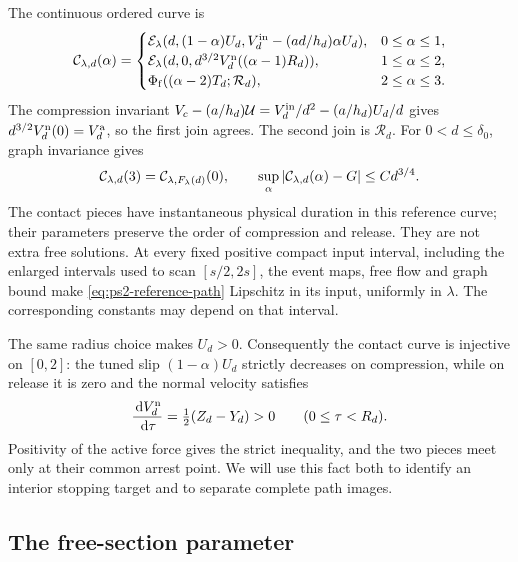 The continuous ordered curve is
\begin{equation}
 \mathcal C_{\lambda,d}(\alpha)=
 \begin{cases}
 \mathcal E_\lambda(d,(1-\alpha)U_d,
                  V_d^{\rm in}-(ad/h_d)\alpha U_d),&0\le\alpha\le1,\\
 \mathcal E_\lambda(d,0,d^{3/2}V_d^{\rm n}((\alpha-1)R_d)),&1\le\alpha\le2,\\
 \Phi_{\rm f}((\alpha-2)T_d;\mathcal R_d),&2\le\alpha\le3.
 \end{cases}\label{eq:ps2-reference-path}
\end{equation}
The compression invariant
$V_c-(a/h_d)\mathcal U=V_d^{\rm in}/d^2-(a/h_d)U_d/d$
gives $d^{3/2}V_d^{\rm n}(0)=V_d^{\rm a}$, so the first join agrees.
The second join is $\mathcal R_d$. For $0<d\le\delta_0$, graph invariance gives
\begin{equation}
 \mathcal C_{\lambda,d}(3)=\mathcal C_{\lambda,F_\lambda(d)}(0),\qquad
 \sup_\alpha|\mathcal C_{\lambda,d}(\alpha)-G|\le Cd^{3/4}.
 \label{gr:curve-joins}
\end{equation}
The contact pieces have instantaneous physical duration in this
reference curve; their parameters preserve the order of compression
and release. They are not extra free solutions. At every fixed
positive compact input interval, including the enlarged intervals
used to scan $[s/2,2s]$, the event maps, free flow and graph bound
make \eqref{eq:ps2-reference-path} Lipschitz in its input, uniformly in $\lambda$.
The corresponding constants may depend on that interval.

The same radius choice makes $U_d>0$. Consequently the contact
curve is injective on $[0,2]$: the tuned slip $(1-\alpha)U_d$
strictly decreases on compression, while on release it is zero
and the normal velocity satisfies
\begin{equation}
 \frac{\,\mathrm d V_d^{\rm n}}{\,\mathrm d\tau}
       =\tfrac12(Z_d-Y_d)>0\qquad(0\le\tau<R_d).
 \label{gr:contact-injectivity}
\end{equation}
Positivity of the active force gives the strict inequality, and
the two pieces meet only at their common arrest point. We will use
this fact both to identify an interior stopping target and to
separate complete path images.

\subsection{The free-section parameter}
\label{gr:free-section}

